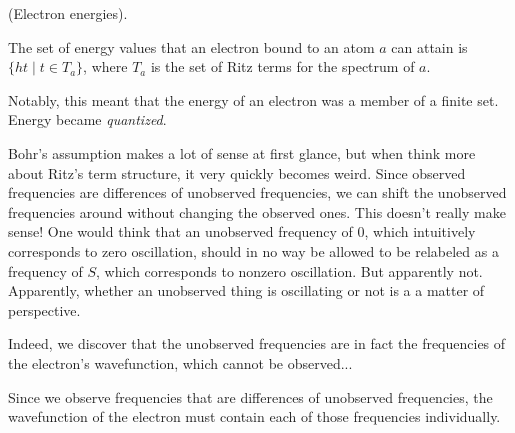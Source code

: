 \documentclass{article}
\begin{document}
\begin{axiom}
	(Electron energies).
	
	The set of energy values that an electron bound to an atom $a$ can attain is $\{ ht \mid t \in T_a\}$, where $T_a$ is the set of Ritz terms for the spectrum of $a$.
\end{axiom}

Notably, this meant that the energy of an electron was a member of a finite set. Energy became \textit{quantized}.

Bohr's assumption makes a lot of sense at first glance, but when think more about Ritz's term structure, it very quickly becomes weird. Since observed frequencies are differences of unobserved frequencies, we can shift the unobserved frequencies around without changing the observed ones. This doesn't really make sense! One would think that an unobserved frequency of $0$, which intuitively corresponds to zero oscillation, should in no way be allowed to be relabeled as a frequency of $S$, which corresponds to nonzero oscillation. But apparently not. Apparently, whether an unobserved thing is oscillating or not is a a matter of perspective.

Indeed, we discover that the unobserved frequencies are in fact the frequencies of the electron's wavefunction, which cannot be observed...

\begin{theorem}
	Since we observe frequencies that are differences of unobserved frequencies, the wavefunction of the electron must contain each of those frequencies individually.
\end{theorem}
\end{document}
